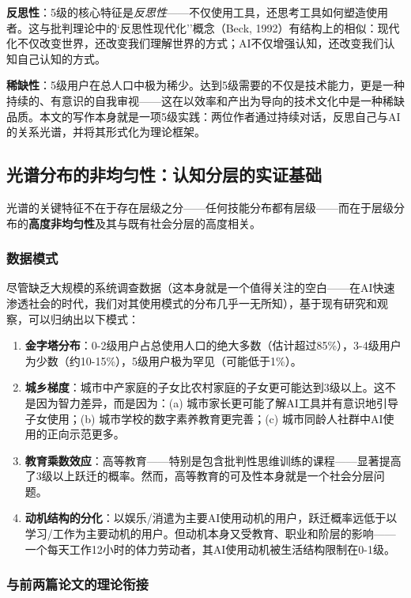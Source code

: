 \documentclass[12pt,a4paper]{ctexart}
\begin{document}
\textbf{反思性}：5级的核心特征是\textit{反思性}——不仅使用工具，还思考工具如何塑造使用者。这与批判理论中的`反思性现代化''概念（Beck, 1992）有结构上的相似：现代化不仅改变世界，还改变我们理解世界的方式；AI不仅增强认知，还改变我们认知自己认知的方式。

\textbf{稀缺性}：5级用户在总人口中极为稀少。达到5级需要的不仅是技术能力，更是一种持续的、有意识的自我审视——这在以效率和产出为导向的技术文化中是一种稀缺品质。本文的写作本身就是一项5级实践：两位作者通过持续对话，反思自己与AI的关系光谱，并将其形式化为理论框架。

\subsection{光谱分布的非均匀性：认知分层的实证基础}

光谱的关键特征不在于存在层级之分——任何技能分布都有层级——而在于层级分布的\textbf{高度非均匀性}及其与既有社会分层的高度相关。

\subsubsection{数据模式}

尽管缺乏大规模的系统调查数据（这本身就是一个值得关注的空白——在AI快速渗透社会的时代，我们对其使用模式的分布几乎一无所知），基于现有研究和观察，可以归纳出以下模式：

\begin{enumerate}[label=(\arabic*)]
\item \textbf{金字塔分布}：0-2级用户占总使用人口的绝大多数（估计超过85\%），3-4级用户为少数（约10-15\%），5级用户极为罕见（可能低于1\%）。
\item \textbf{城乡梯度}：城市中产家庭的子女比农村家庭的子女更可能达到3级以上。这不是因为智力差异，而是因为：(a) 城市家长更可能了解AI工具并有意识地引导子女使用；(b) 城市学校的数字素养教育更完善；(c) 城市同龄人社群中AI使用的正向示范更多。
\item \textbf{教育乘数效应}：高等教育——特别是包含批判性思维训练的课程——显著提高了3级以上跃迁的概率。然而，高等教育的可及性本身就是一个社会分层问题。
\item \textbf{动机结构的分化}：以娱乐/消遣为主要AI使用动机的用户，跃迁概率远低于以学习/工作为主要动机的用户。但动机本身又受教育、职业和阶层的影响——一个每天工作12小时的体力劳动者，其AI使用动机被生活结构限制在0-1级。
\end{enumerate}

\subsubsection{与前两篇论文的理论衔接}
\end{document}
